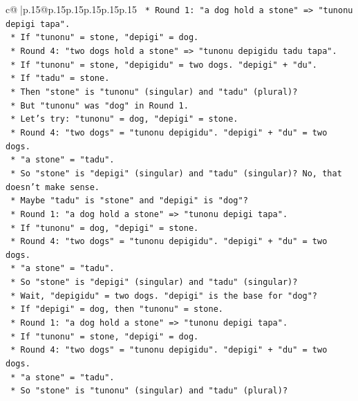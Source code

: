 \documentclass{article}
\begin{document}
{\begin{supertabular}{c@{$\;$}|p{.15\linewidth}@{}p{.15\linewidth}p{.15\linewidth}p{.15\linewidth}p{.15\linewidth}p{.15\linewidth}}
{{{\texttt{        *   Round 1: "a dog hold a stone" => "tunonu depigi tapa".} \\
\texttt{        *   If "tunonu" = stone, "depigi" = dog.} \\
\texttt{        *   Round 4: "two dogs hold a stone" => "tunonu depigidu tadu tapa".} \\
\texttt{        *   If "tunonu" = stone, "depigidu" = two dogs. "depigi" + "du".} \\
\texttt{        *   If "tadu" = stone.} \\
\texttt{        *   Then "stone" is "tunonu" (singular) and "tadu" (plural)?} \\
\texttt{        *   But "tunonu" was "dog" in Round 1.} \\
\texttt{        *   Let's try: "tunonu" = dog, "depigi" = stone.} \\
\texttt{        *   Round 4: "two dogs" = "tunonu depigidu". "depigi" + "du" = two dogs.} \\
\texttt{        *   "a stone" = "tadu".} \\
\texttt{        *   So "stone" is "depigi" (singular) and "tadu" (singular)? No, that doesn't make sense.} \\
\texttt{        *   Maybe "tadu" is "stone" and "depigi" is "dog"?} \\
\texttt{        *   Round 1: "a dog hold a stone" => "tunonu depigi tapa".} \\
\texttt{        *   If "tunonu" = dog, "depigi" = stone.} \\
\texttt{        *   Round 4: "two dogs" = "tunonu depigidu". "depigi" + "du" = two dogs.} \\
\texttt{        *   "a stone" = "tadu".} \\
\texttt{        *   So "stone" is "depigi" (singular) and "tadu" (singular)?} \\
\texttt{        *   Wait, "depigidu" = two dogs. "depigi" is the base for "dog"?} \\
\texttt{        *   If "depigi" = dog, then "tunonu" = stone.} \\
\texttt{        *   Round 1: "a dog hold a stone" => "tunonu depigi tapa".} \\
\texttt{        *   If "tunonu" = stone, "depigi" = dog.} \\
\texttt{        *   Round 4: "two dogs" = "tunonu depigidu". "depigi" + "du" = two dogs.} \\
\texttt{        *   "a stone" = "tadu".} \\
\texttt{        *   So "stone" is "tunonu" (singular) and "tadu" (plural)?} \\
}}}
\end{supertabular}}
\end{document}
